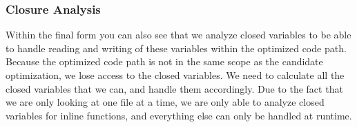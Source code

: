 \subsubsection{Closure Analysis}
Within the final form you can also see that we analyze closed variables to be able to handle reading and writing of these variables within the optimized code path. Because the optimized code path is not in the same scope as the candidate optimization, we lose access to the closed variables.  We need to calculate all the closed variables that we can, and handle them accordingly.  Due to the fact that we are only looking at one file at a time, we are only able to analyze closed variables for inline functions, and everything else can only be handled at runtime.  